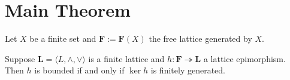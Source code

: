 
\date{\today}



\maketitle

\section{Main Theorem}
\label{sec:introduction}

Let $X$ be a finite set and $\mathbf F := \mathbf F(X)$ the free lattice generated by $X$.

\begin{theorem}
Suppose $\mathbf L = \langle L, \wedge, \vee\rangle$ is a finite lattice and $h\colon \mathbf{F} \twoheadrightarrow \mathbf{L}$ a lattice epimorphism.
Then $h$ is bounded if and only if $\ker h$ is finitely generated.
\end{theorem}

